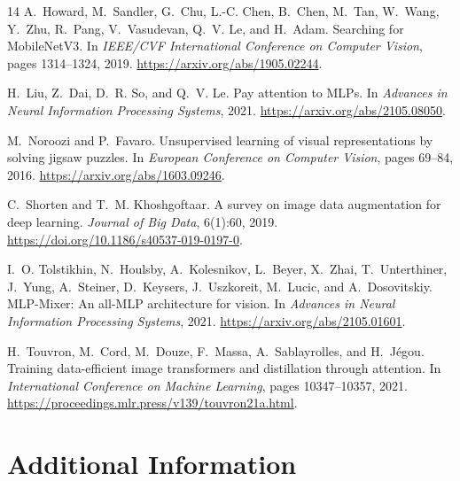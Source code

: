 \documentclass[12pt]{article}
\begin{document}
\begin{thebibliography}{14}
A.~Howard, M.~Sandler, G.~Chu, L.-C. Chen, B.~Chen, M.~Tan, W.~Wang, Y.~Zhu, R.~Pang, V.~Vasudevan, Q.~V. Le, and H.~Adam.
\newblock Searching for MobileNetV3.
\newblock In \emph{IEEE/CVF International Conference on Computer Vision}, pages 1314--1324, 2019.
\newblock \url{https://arxiv.org/abs/1905.02244}.

H.~Liu, Z.~Dai, D.~R. So, and Q.~V. Le.
\newblock Pay attention to MLPs.
\newblock In \emph{Advances in Neural Information Processing Systems}, 2021.
\newblock \url{https://arxiv.org/abs/2105.08050}.

M.~Noroozi and P.~Favaro.
\newblock Unsupervised learning of visual representations by solving jigsaw puzzles.
\newblock In \emph{European Conference on Computer Vision}, pages 69--84, 2016.
\newblock \url{https://arxiv.org/abs/1603.09246}.

C.~Shorten and T.~M. Khoshgoftaar.
\newblock A survey on image data augmentation for deep learning.
\newblock \emph{Journal of Big Data}, 6(1):60, 2019.
\newblock \url{https://doi.org/10.1186/s40537-019-0197-0}.

I.~O. Tolstikhin, N.~Houlsby, A.~Kolesnikov, L.~Beyer, X.~Zhai, T.~Unterthiner, J.~Yung, A.~Steiner, D.~Keysers, J.~Uszkoreit, M.~Lucic, and A.~Dosovitskiy.
\newblock MLP-Mixer: An all-MLP architecture for vision.
\newblock In \emph{Advances in Neural Information Processing Systems}, 2021.
\newblock \url{https://arxiv.org/abs/2105.01601}.

H.~Touvron, M.~Cord, M.~Douze, F.~Massa, A.~Sablayrolles, and H.~Jégou.
\newblock Training data-efficient image transformers and distillation through attention.
\newblock In \emph{International Conference on Machine Learning}, pages 10347--10357, 2021.
\newblock \url{https://proceedings.mlr.press/v139/touvron21a.html}.

\end{thebibliography}

\clearpage
\section{Additional Information}
\label{sec:additional-information}
\end{document}
